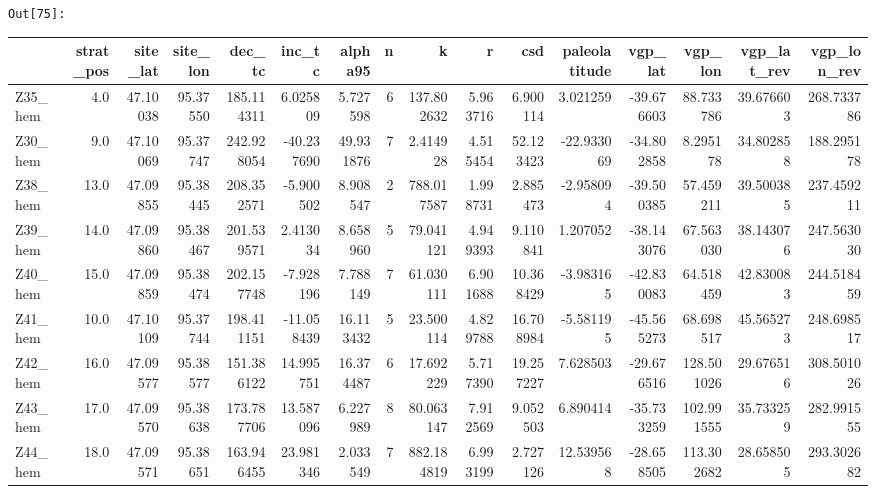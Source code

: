 \documentclass[11pt]{article}
\begin{document}
\texttt{\color{outcolor}Out[{\color{outcolor}75}]:}
    \begin{sidewaystable}
    {\tiny\begin{tabular}{lrrrrrrrrrrrrrrr}
\toprule
{} &  strat\_pos &  site\_lat &  site\_lon &      dec\_tc &     inc\_tc &    alpha95 &  n &           k &         r &        csd &  paleolatitude &    vgp\_lat &     vgp\_lon &  vgp\_lat\_rev &  vgp\_lon\_rev \\
\midrule
Z35\_hem &        4.0 &  47.10038 &  95.37550 &  185.114311 &   6.025809 &   5.727598 &  6 &  137.802632 &  5.963716 &   6.900114 &       3.021259 & -39.676603 &   88.733786 &    39.676603 &   268.733786 \\
Z30\_hem &        9.0 &  47.10069 &  95.37747 &  242.928054 & -40.237690 &  49.931876 &  7 &    2.414928 &  4.515454 &  52.123423 &     -22.933069 & -34.802858 &    8.295178 &    34.802858 &   188.295178 \\
Z38\_hem &       13.0 &  47.09855 &  95.38445 &  208.352571 &  -5.900502 &   8.908547 &  2 &  788.017587 &  1.998731 &   2.885473 &      -2.958094 & -39.500385 &   57.459211 &    39.500385 &   237.459211 \\
Z39\_hem &       14.0 &  47.09860 &  95.38467 &  201.539571 &   2.413034 &   8.658960 &  5 &   79.041121 &  4.949393 &   9.110841 &       1.207052 & -38.143076 &   67.563030 &    38.143076 &   247.563030 \\
Z40\_hem &       15.0 &  47.09859 &  95.38474 &  202.157748 &  -7.928196 &   7.788149 &  7 &   61.030111 &  6.901688 &  10.368429 &      -3.983165 & -42.830083 &   64.518459 &    42.830083 &   244.518459 \\
Z41\_hem &       10.0 &  47.10109 &  95.37744 &  198.411151 & -11.058439 &  16.113432 &  5 &   23.500114 &  4.829788 &  16.708984 &      -5.581195 & -45.565273 &   68.698517 &    45.565273 &   248.698517 \\
Z42\_hem &       16.0 &  47.09577 &  95.38577 &  151.386122 &  14.995751 &  16.374487 &  6 &   17.692229 &  5.717390 &  19.257227 &       7.628503 & -29.676516 &  128.501026 &    29.676516 &   308.501026 \\
Z43\_hem &       17.0 &  47.09570 &  95.38638 &  173.787706 &  13.587096 &   6.227989 &  8 &   80.063147 &  7.912569 &   9.052503 &       6.890414 & -35.733259 &  102.991555 &    35.733259 &   282.991555 \\
Z44\_hem &       18.0 &  47.09571 &  95.38651 &  163.946455 &  23.981346 &   2.033549 &  7 &  882.184819 &  6.993199 &   2.727126 &      12.539568 & -28.658505 &  113.302682 &    28.658505 &   293.302682 \\

\end{tabular}}
\end{sidewaystable}
\end{document}
